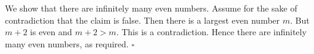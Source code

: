 We show that there are infinitely many even numbers.
Assume for the sake of contradiction that the claim is false.
Then there is a largest even number $m$.
But $m + 2$ is even and $m + 2 > m$.
This is a contradiction.
Hence there are infinitely many even numbers, as required. \hfill$\square$